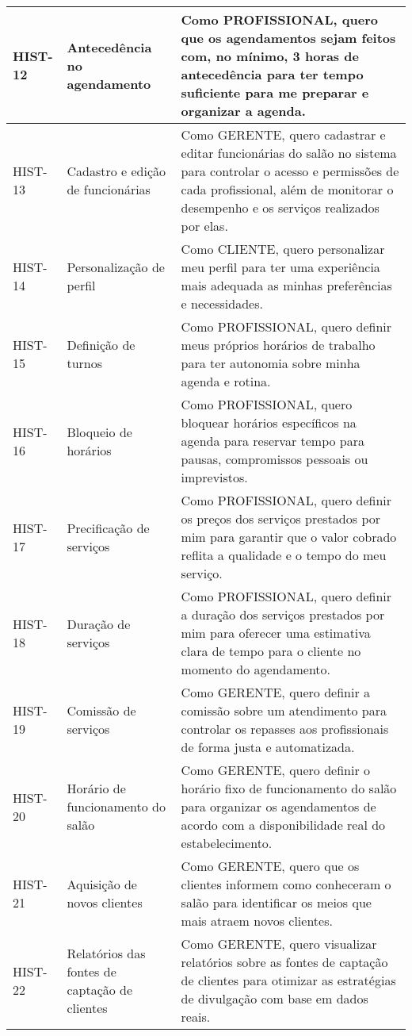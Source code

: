 \begin{longtable}{|p{2cm}|p{4cm}|p{9cm}|}
	HIST-12 & Antecedência no agendamento & Como PROFISSIONAL, quero que os agendamentos sejam feitos com, no mínimo, 3 horas de antecedência para ter tempo suficiente para me preparar e organizar a agenda. \\ \hline
	HIST-13 & Cadastro e edição de funcionárias & Como GERENTE, quero cadastrar e editar funcionárias do salão no sistema para controlar o acesso e permissões de cada profissional, além de monitorar o desempenho e os serviços realizados por elas. \\ \hline
	HIST-14 & Personalização de perfil & Como CLIENTE, quero personalizar meu perfil para ter uma experiência mais adequada as minhas preferências e necessidades. \\ \hline
	HIST-15 & Definição de turnos & Como PROFISSIONAL, quero definir meus próprios horários de trabalho para ter autonomia sobre minha agenda e rotina. \\ \hline
	HIST-16 & Bloqueio de horários & Como PROFISSIONAL, quero bloquear horários específicos na agenda para reservar tempo para pausas, compromissos pessoais ou imprevistos. \\ \hline
	HIST-17 & Precificação de serviços & Como PROFISSIONAL, quero definir os preços dos serviços prestados por mim para garantir que o valor cobrado reflita a qualidade e o tempo do meu serviço. \\ \hline
	HIST-18 & Duração de serviços & Como PROFISSIONAL, quero definir a duração dos serviços prestados por mim para oferecer uma estimativa clara de tempo para o cliente no momento do agendamento. \\ \hline
	HIST-19 & Comissão de serviços & Como GERENTE, quero definir a comissão sobre um atendimento para controlar os repasses aos profissionais de forma justa e automatizada. \\ \hline
	HIST-20 & Horário de funcionamento do salão & Como GERENTE, quero definir o horário fixo de funcionamento do salão para organizar os agendamentos de acordo com a disponibilidade real do estabelecimento. \\ \hline
	HIST-21 & Aquisição de novos clientes & Como GERENTE, quero que os clientes informem como conheceram o salão para identificar os meios que mais atraem novos clientes. \\ \hline
	HIST-22 & Relatórios das fontes de captação de clientes & Como GERENTE, quero visualizar relatórios sobre as fontes de captação de clientes para otimizar as estratégias de divulgação com base em dados reais. \\ \hline

\end{longtable}
